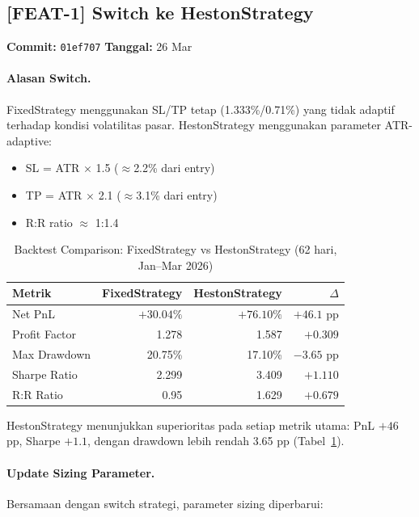 \documentclass[10pt,a4paper]{article}
\begin{document}
\subsection{[FEAT-1] Switch ke HestonStrategy}
\label{subsec:heston}

\noindent\textbf{Commit:} \texttt{01ef707} \quad \textbf{Tanggal:} 26 Mar

\paragraph{Alasan Switch.}
FixedStrategy menggunakan SL/TP tetap (1.333\%/0.71\%) yang tidak adaptif terhadap
kondisi volatilitas pasar. HestonStrategy menggunakan parameter ATR-adaptive:
\begin{itemize}
    \item SL = ATR $\times$ 1.5 ($\approx$2.2\% dari entry)
    \item TP = ATR $\times$ 2.1 ($\approx$3.1\% dari entry)
    \item R:R ratio $\approx$ 1:1.4
\end{itemize}

\begin{table}[ht]
\caption{Backtest Comparison: FixedStrategy vs HestonStrategy (62 hari, Jan--Mar 2026)}
\label{tab:backtest}
\centering
\small
\begin{tabular}{lrrr}
\toprule
\textbf{Metrik} & \textbf{FixedStrategy} & \textbf{HestonStrategy} & \textbf{$\Delta$} \\
\midrule
Net PnL         & $+30.04\%$ & $+76.10\%$ & $+46.1$ pp \\
Profit Factor   & 1.278      & 1.587      & $+0.309$   \\
Max Drawdown    & 20.75\%    & 17.10\%    & $-3.65$ pp \\
Sharpe Ratio    & 2.299      & 3.409      & $+1.110$   \\
R:R Ratio       & 0.95       & 1.629      & $+0.679$   \\
\bottomrule
\end{tabular}
\end{table}

HestonStrategy menunjukkan superioritas pada setiap metrik utama: PnL $+46$ pp,
Sharpe $+1.1$, dengan drawdown lebih rendah 3.65 pp (Tabel~\ref{tab:backtest}).

\paragraph{Update Sizing Parameter.}
Bersamaan dengan switch strategi, parameter sizing diperbarui:
\end{document}
